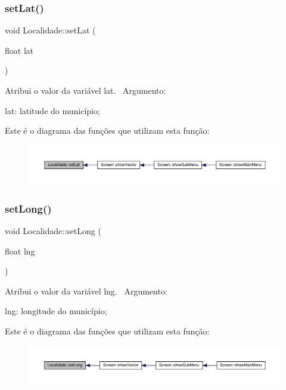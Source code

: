 \subsubsection{\texorpdfstring{set\+Lat()}{setLat()}}
{\footnotesize\ttfamily void Localidade\+::set\+Lat (\begin{DoxyParamCaption}\item[{float}]{lat }\end{DoxyParamCaption})}

Atribui o valor da variável lat.~\newline
Argumento\+:
\begin{DoxyItemize}
\item lat\+: latitude do município;
\end{DoxyItemize}Este é o diagrama das funções que utilizam esta função\+:\nopagebreak
\begin{figure}[H]
\begin{center}
\leavevmode
\includegraphics[width=350pt]{classLocalidade_af9abc70199d4f50cd90add07c6d6e617_icgraph}
\end{center}
\end{figure}
\mbox{\label{classLocalidade_a9b5f805c802337480712bf010669ced8}} 
\subsubsection{\texorpdfstring{set\+Long()}{setLong()}}
{\footnotesize\ttfamily void Localidade\+::set\+Long (\begin{DoxyParamCaption}\item[{float}]{lng }\end{DoxyParamCaption})}

Atribui o valor da variável lng.~\newline
Argumento\+:
\begin{DoxyItemize}
\item lng\+: longitude do município;
\end{DoxyItemize}Este é o diagrama das funções que utilizam esta função\+:\nopagebreak
\begin{figure}[H]
\begin{center}
\leavevmode
\includegraphics[width=350pt]{classLocalidade_a9b5f805c802337480712bf010669ced8_icgraph}
\end{center}
\end{figure}
\mbox{\label{classLocalidade_a90ac71109a4954863bb045a57e3fc29d}} 
